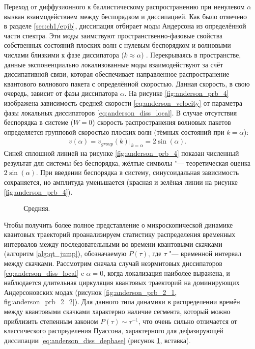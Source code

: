Переход от диффузионного к баллистическому распространению при ненулевом \(\alpha\) вызван взаимодействием между беспорядком и диссипацией. 
Как было отмечено в разделе \cref{sec:ch1/epjb}, диссипация отбирает моды Андерсона из определённой части спектра. 
Эти моды заимствуют пространственно-фазовые свойства собственных состояний плоских волн с нулевым беспорядком и волновыми числами близкими к фазе диссипатора (\(k\approx \alpha\)) \cite{Vershinina2017, Ishii1973}. 
Перекрываясь в пространстве, данные экспоненциально локализованные моды взаимодействуют за счёт диссипативной связи, которая обеспечивает направленное распространение квантового волнового пакета с определённой скоростью. 
Данная скорость, в свою очередь, зависит от фазы диссипатора \(\alpha\). 
На рисунке \cref{fig:anderson_prb_4} изображена зависимость средней скорости \cref{eq:anderson_velocity} от параметра фазы локальных диссипаторов \cref{eq:anderson_diss_local}. В случае отсутствия беспорядка в системе (\(W=0\)) скорость распространения волновых пакетов определяется групповой скоростью плоских волн (тёмных состояний при \(k=\alpha\)):
\begin{equation}
\label{eq:anderson_velocity_sin}
\begin{gathered}
v(\alpha) = v_{group}(k)|_{k=\alpha} = 2 \sin(\alpha) .
\end{gathered}
\end{equation}
Синей сплошной линией на рисунке \cref{fig:anderson_prb_4} показан численный результат для системы без беспорядка, жёлтые символы "--- теоретическая оценка \(2 \sin(\alpha)\). 
При введении беспорядка в систему, синусоидальная зависимость сохраняется, но амплитуда уменьшается (красная и зелёная линии на рисунке \cref{fig:anderson_prb_4}).

\begin{figure}[h]
	\caption{
		Средняя.
	}
	\label{fig:anderson_prb_5}
\end{figure}

Чтобы получить более полное представление о микроскопической динамике квантовых траекторий проанализируем статистику распределения временных интервалов между последовательными во времени квантовыми скачками (алгоритм \ref{alg:qt_jump}), обозначаемую \(P(\tau)\), где \(\tau\) "--- временной интервал между скачками.
Рассмотрим сначала случай неэрмитовых диссипаторов \cref{eq:anderson_diss_local} c \(\alpha=0\), когда локализация наиболее выражена, и наблюдается длительная циркуляция квантовых  траекторий на доминирующих Андерсоновских модах (рисунок \cref{fig:anderson_prb_2_1, fig:anderson_prb_2_2}). 
Для данного типа динамики в распределении времён между квантовыми скачками  характерно наличие сегмента, который можно приблизить степенным законом \(P(\tau) \sim \tau^{-1}\), что очень сильно отличается от классического распределения Пуассона, характерного для дефазирующей диссипации \cref{eq:anderson_diss_dephase} (рисунок \cref{fig:anderson_prb_5}, вставка).





